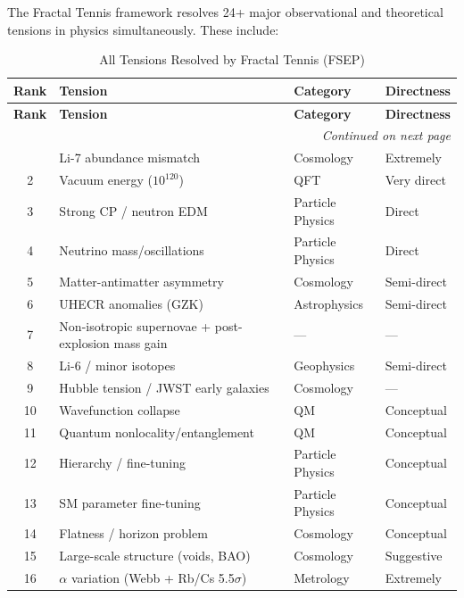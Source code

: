 \documentclass[11pt,a4paper]{article}
\begin{document}
  The Fractal Tennis framework resolves 24+ major observational and theoretical tensions in physics simultaneously. These include:
  \begin{longtable}{|c|p{4.5cm}|p{2.5cm}|p{2cm}|}
    \caption{All Tensions Resolved by Fractal Tennis (FSEP)} \\
    \hline
    \textbf{Rank} & \textbf{Tension} & \textbf{Category} & \textbf{Directness} \\
    \hline
    \endfirsthead
    \hline
    \textbf{Rank} & \textbf{Tension} & \textbf{Category} & \textbf{Directness} \\
    \hline
    \endhead
    \hline
    \multicolumn{4}{r|}{\textit{Continued on next page}} \\
    \endfoot
    \hline
    \endlastfoot
    1 & Li-7 abundance mismatch & Cosmology & Extremely \\
    \hline
    2 & Vacuum energy ($10^{120}$) & QFT & Very direct \\
    \hline
    3 & Strong CP / neutron EDM & Particle Physics & Direct \\
    \hline
    4 & Neutrino mass/oscillations & Particle Physics & Direct \\
    \hline
    5 & Matter-antimatter asymmetry & Cosmology & Semi-direct \\
    \hline
    6 & UHECR anomalies (GZK) & Astrophysics & Semi-direct \\
    \hline
    7 & Non-isotropic supernovae + post-explosion mass gain & — & — \\
    \hline
    8 & Li-6 / minor isotopes & Geophysics & Semi-direct \\
    \hline
    9 & Hubble tension / JWST early galaxies & Cosmology & — \\
    \hline
    10 & Wavefunction collapse & QM & Conceptual \\
    \hline
    11 & Quantum nonlocality/entanglement & QM & Conceptual \\
    \hline
    12 & Hierarchy / fine-tuning & Particle Physics & Conceptual \\
    \hline
    13 & SM parameter fine-tuning & Particle Physics & Conceptual \\
    \hline
    14 & Flatness / horizon problem & Cosmology & Conceptual \\
    \hline
    15 & Large-scale structure (voids, BAO) & Cosmology & Suggestive \\
    \hline
    16 & $\alpha$ variation (Webb + Rb/Cs 5.5$\sigma$) & Metrology & Extremely \\

\end{longtable}
\end{document}
